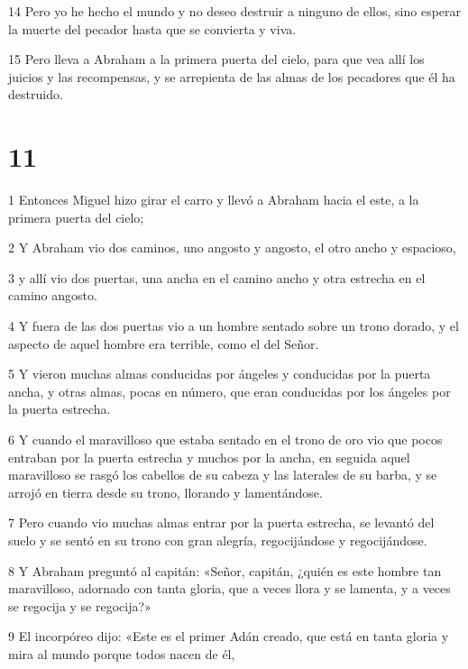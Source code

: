 \par 14 Pero yo he hecho el mundo y no deseo destruir a ninguno de ellos, sino esperar la muerte del pecador hasta que se convierta y viva.

\par 15 Pero lleva a Abraham a la primera puerta del cielo, para que vea allí los juicios y las recompensas, y se arrepienta de las almas de los pecadores que él ha destruido.

\chapter{11}

\par 1 Entonces Miguel hizo girar el carro y llevó a Abraham hacia el este, a la primera puerta del cielo;

\par 2 Y Abraham vio dos caminos, uno angosto y angosto, el otro ancho y espacioso,

\par 3 y allí vio dos puertas, una ancha en el camino ancho y otra estrecha en el camino angosto.

\par 4 Y fuera de las dos puertas vio a un hombre sentado sobre un trono dorado, y el aspecto de aquel hombre era terrible, como el del Señor.

\par 5 Y vieron muchas almas conducidas por ángeles y conducidas por la puerta ancha, y otras almas, pocas en número, que eran conducidas por los ángeles por la puerta estrecha.

\par 6 Y cuando el maravilloso que estaba sentado en el trono de oro vio que pocos entraban por la puerta estrecha y muchos por la ancha, en seguida aquel maravilloso se rasgó los cabellos de su cabeza y las laterales de su barba, y se arrojó en tierra desde su trono, llorando y lamentándose.

\par 7 Pero cuando vio muchas almas entrar por la puerta estrecha, se levantó del suelo y se sentó en su trono con gran alegría, regocijándose y regocijándose.

\par 8 Y Abraham preguntó al capitán: «Señor, capitán, ¿quién es este hombre tan maravilloso, adornado con tanta gloria, que a veces llora y se lamenta, y a veces se regocija y se regocija?»

\par 9 El incorpóreo dijo: «Este es el primer Adán creado, que está en tanta gloria y mira al mundo porque todos nacen de él,

